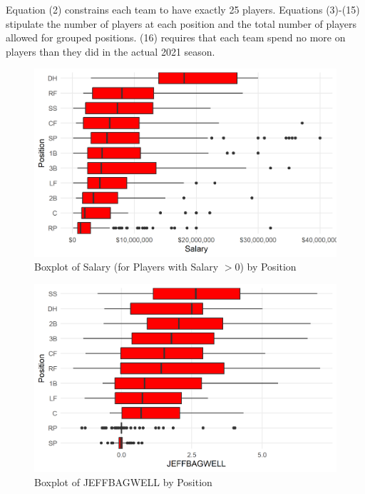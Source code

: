 \documentclass{article}
\begin{document}
Equation (2) constrains each team to have exactly 25 players. Equations (3)-(15) stipulate the number of players at each position and the total number of players allowed for grouped positions. (16) requires that each team spend no more on players than they did in the actual 2021 season. 




\begin{figure}[h]
\caption{Boxplot of Salary (for Players with Salary $> 0$) by Position}
\label{fig:salary_position_boxplot}
\centering
\includegraphics[width=0.7\paperwidth, scale=1.25]{salary_position_boxplots.png}
\end{figure}

\begin{figure}[h]
\caption{Boxplot of JEFFBAGWELL by Position}
\label{fig:salary_war_boxplot}
\centering
\includegraphics[width=0.7\paperwidth, scale=1.25]{war_position_boxplots.png}
\end{figure}
\end{document}
